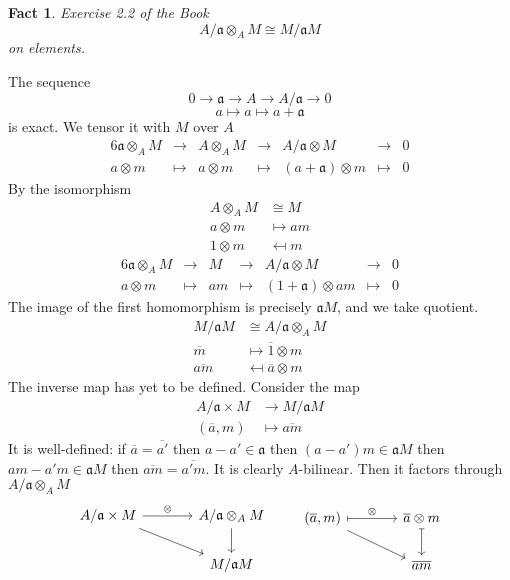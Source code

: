 \documentclass{article}
\newcommand{\mf}{\mathfrak}
\newcommand{\aaa}{\mf a}
\newtheorem{theorem}{Fact}[section]
\begin{document}
\begin{theorem}
Exercise 2.2 of the Book
\[
A/\aaa \otimes_A M \cong M/\aaa M
\]
on elements.
\end{theorem}
The sequence 
\[
0 \rightarrow \aaa \rightarrow A \rightarrow A/\aaa \rightarrow 0
\]
\[
a \mapsto a \mapsto a + \aaa
\]
is exact. We tensor it with $M$ over $A$
\begin{alignat*}{6}
\aaa \otimes_A M 
  & \rightarrow 
  & A \otimes_A M 
  & \rightarrow 
  & A/\aaa \otimes M     
  & \rightarrow 
  & 0 \\
a \otimes m      
  & \mapsto     
  & a \otimes m   
  & \mapsto     
  & (a + \aaa) \otimes m 
  & \mapsto 
  & 0
\end{alignat*}
By the isomorphism
\begin{align*}
A \otimes_A M & \cong M \\
a \otimes m & \mapsto am \\
1 \otimes m & \mapsfrom m
\end{align*}
\begin{alignat*}{6}
\aaa \otimes_A M 
  & \rightarrow 
  & M 
  & \rightarrow 
  & A/\aaa \otimes M     
  & \rightarrow 
  & 0 \\
a \otimes m      
  & \mapsto     
  & am   
  & \mapsto     
  & (1 + \aaa) \otimes am 
  & \mapsto 
  & 0
\end{alignat*}
The image of the first homomorphism is precisely $\aaa M$, and we take quotient.
\begin{align*}
M/\aaa M & \cong A/\aaa \otimes_A M \\
\overline{m} & \mapsto \overline{1} \otimes m \\
\overline{am} & \mapsfrom \overline{a} \otimes m
\end{align*}
The inverse map has yet to be defined. Consider the map
\begin{align*}
A/\aaa \times M & \longrightarrow M/\aaa M \\
(\overline{a}, m) & \longmapsto \overline{am}
\end{align*}
It is well-defined: if $\overline{a} = \overline{a'}$ then $a - a' \in \aaa$ then $(a - a')m \in \aaa M$ then $am - a'm \in \aaa M$ then $\overline{am} = \overline{a'm}$. It is clearly $A$-bilinear. Then it factors through $A/\aaa \otimes_A M$
\[
\begin{tikzcd}[column sep=large]
A/\aaa \times M \arrow{r}{\otimes} \arrow{rd} & A/\aaa \otimes_A M \arrow{d} \\
& M/\aaa M
\end{tikzcd}
%
\qquad
%
\begin{tikzcd}[column sep=large]
(\overline{a}, m) \arrow[r, mapsto, "\otimes"] \arrow{rd} & \overline{a} \otimes m \arrow[d, mapsto] \\
& \overline{am}
\end{tikzcd}
\]
\end{document}
